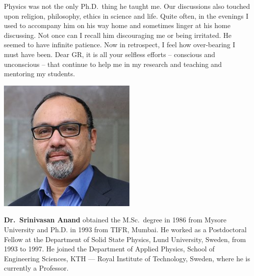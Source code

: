 Physics was not the only Ph.D.\ thing he taught me. Our discussions also touched upon religion, philosophy, ethics in science and life. Quite often, in the evenings I used to accompany him on his way home and sometimes linger at his home discussing. Not once can I recall him discouraging me or being irritated. He seemed to have infinite patience. Now in retrospect, I feel how over-bearing I must have been. Dear GR, it is all your selfless efforts – conscious and unconscious – that continue to help me in my research and teaching and mentoring my students.
\bigskip

\centerline{\includegraphics[scale=0.5]{authorsphotos/Prof_Srinivasan_Anand.jpg}}
\bigskip

\noindent
\textbf{Dr.\ Srinivasan Anand} obtained the M.Sc.\ degree in 1986 from Mysore University and Ph.D. in 1993 from TIFR, Mumbai. He worked as a Postdoctoral Fellow at the Department of Solid State Physics, Lund University, Sweden, from 1993 to 1997. He joined the Department of Applied Physics, School of Engineering Sciences, KTH --- Royal Institute of Technology, Sweden, where he is currently a Professor.

